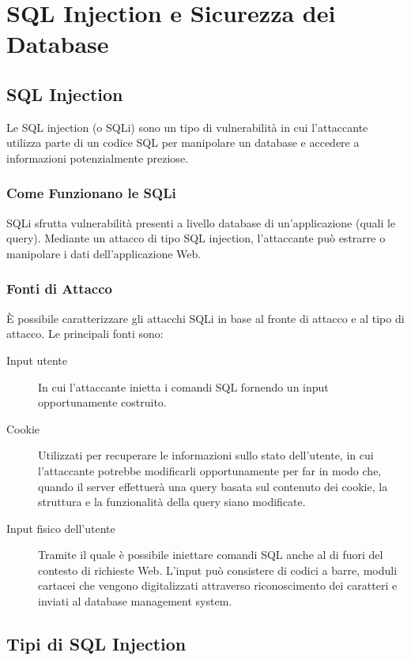 \chapter{SQL Injection e Sicurezza dei Database}

\section{SQL Injection}

Le SQL injection (o SQLi) sono un tipo di vulnerabilità in cui l'attaccante utilizza parte di un codice SQL per manipolare un database e accedere a informazioni potenzialmente preziose.

\subsection{Come Funzionano le SQLi}

SQLi sfrutta vulnerabilità presenti a livello database di un'applicazione (quali le query). Mediante un attacco di tipo SQL injection, l'attaccante può estrarre o manipolare i dati dell'applicazione Web.

\subsection{Fonti di Attacco}

È possibile caratterizzare gli attacchi SQLi in base al fronte di attacco e al tipo di attacco. Le principali fonti sono:

\begin{description}
    \item[Input utente] In cui l'attaccante inietta i comandi SQL fornendo un input opportunamente costruito.
    \item[Cookie] Utilizzati per recuperare le informazioni sullo stato dell'utente, in cui l'attaccante potrebbe modificarli opportunamente per far in modo che, quando il server effettuerà una query basata sul contenuto dei cookie, la struttura e la funzionalità della query siano modificate.
    \item[Input fisico dell'utente] Tramite il quale è possibile iniettare comandi SQL anche al di fuori del contesto di richieste Web. L'input può consistere di codici a barre, moduli cartacei che vengono digitalizzati attraverso riconoscimento dei caratteri e inviati al database management system.
\end{description}

\section{Tipi di SQL Injection}

